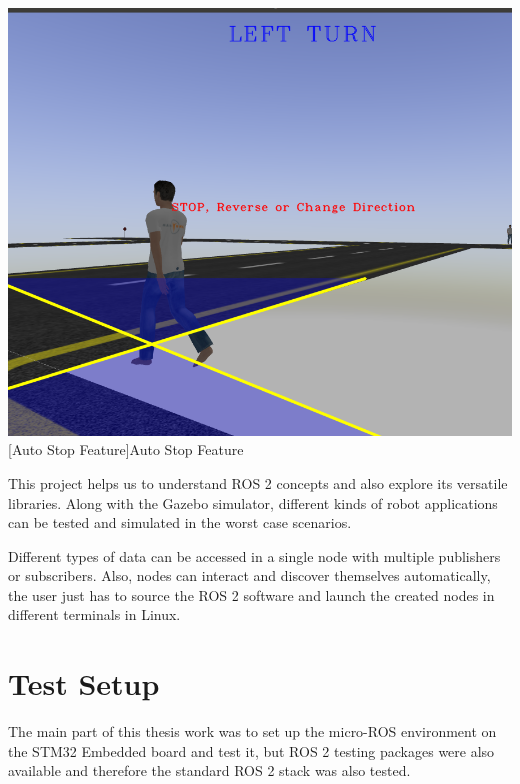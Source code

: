 \documentclass[%
xelatex,
	oneside,		%
	12pt,			%
	parskip=half,	%
	abstracton,
	chapterprefix=true%
    appendixprefix=true]
{scrbook}
\begin{document}
			\begin{center}
\includegraphics[scale=0.3]{fig/final2adas.png}
[Auto Stop Feature]{Auto Stop Feature}
\label{fig:lane1}
\end{center}
This project helps us to understand ROS 2 concepts and also explore its versatile libraries. Along with the Gazebo simulator, different kinds of robot applications can be tested and simulated in the worst case scenarios. 

Different types of data can be accessed in a single node with multiple publishers or subscribers. Also, nodes can interact and discover themselves automatically, the user just has to source the ROS 2 software and launch the created nodes in different terminals in Linux.
	\chapter{Test Setup}
		
\rofoot[\pagemark]{\pagemark}
The main part of this thesis work was to set up the micro-ROS environment on the STM32 Embedded board and test it, but ROS 2 testing packages were also available and therefore the standard ROS 2 stack was also tested.
	
\end{document}
